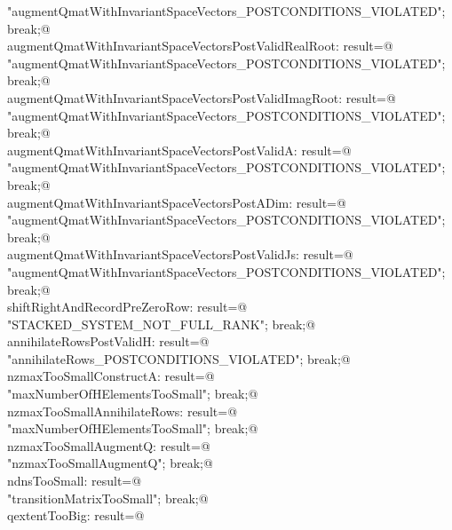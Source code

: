 \documentclass[12pt]{article}
\begin{document}
\begin{flushleft}
\begin{minipage}{\linewidth}
\begin{list}{}{}
\mbox{}\verb@  "augmentQmatWithInvariantSpaceVectors_POSTCONDITIONS_VIOLATED"; break;@\\
\mbox{}\verb@case  augmentQmatWithInvariantSpaceVectorsPostValidRealRoot: result=@\\
\mbox{}\verb@  "augmentQmatWithInvariantSpaceVectors_POSTCONDITIONS_VIOLATED"; break;@\\
\mbox{}\verb@case  augmentQmatWithInvariantSpaceVectorsPostValidImagRoot: result=@\\
\mbox{}\verb@  "augmentQmatWithInvariantSpaceVectors_POSTCONDITIONS_VIOLATED"; break;@\\
\mbox{}\verb@case  augmentQmatWithInvariantSpaceVectorsPostValidA: result=@\\
\mbox{}\verb@  "augmentQmatWithInvariantSpaceVectors_POSTCONDITIONS_VIOLATED"; break;@\\
\mbox{}\verb@case  augmentQmatWithInvariantSpaceVectorsPostADim: result=@\\
\mbox{}\verb@  "augmentQmatWithInvariantSpaceVectors_POSTCONDITIONS_VIOLATED"; break;@\\
\mbox{}\verb@case  augmentQmatWithInvariantSpaceVectorsPostValidJs: result=@\\
\mbox{}\verb@  "augmentQmatWithInvariantSpaceVectors_POSTCONDITIONS_VIOLATED"; break;@\\
\mbox{}\verb@case  shiftRightAndRecordPreZeroRow: result=@\\
\mbox{}\verb@  "STACKED_SYSTEM_NOT_FULL_RANK"; break;@\\
\mbox{}\verb@case  annihilateRowsPostValidH: result=@\\
\mbox{}\verb@  "annihilateRows_POSTCONDITIONS_VIOLATED"; break;@\\
\mbox{}\verb@case nzmaxTooSmallConstructA: result=@\\
\mbox{}\verb@  "maxNumberOfHElementsTooSmall"; break;@\\
\mbox{}\verb@case nzmaxTooSmallAnnihilateRows: result=@\\
\mbox{}\verb@  "maxNumberOfHElementsTooSmall"; break;@\\
\mbox{}\verb@case nzmaxTooSmallAugmentQ: result=@\\
\mbox{}\verb@  "nzmaxTooSmallAugmentQ"; break;@\\
\mbox{}\verb@case ndnsTooSmall: result=@\\
\mbox{}\verb@  "transitionMatrixTooSmall"; break;@\\
\mbox{}\verb@case qextentTooBig: result=@\\

\end{list}
\end{minipage}
\end{flushleft}
\end{document}

